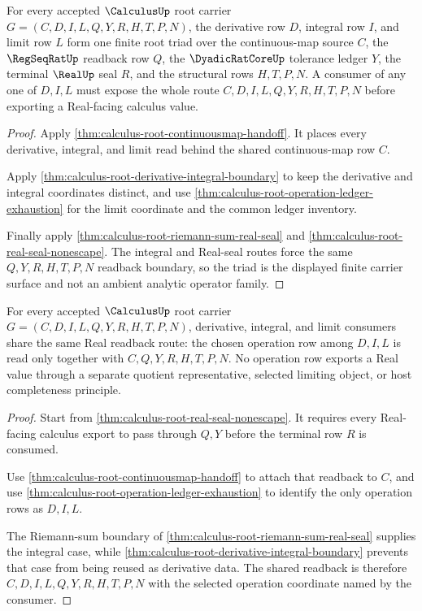 \begin{theorem}
\label{thm:calculus-root-limit-derivative-integral-triad}
For every accepted $\CalculusUp$ root carrier $G=(C,D,I,L,Q,Y,R,H,T,P,N)$, the derivative row $D$, integral row $I$, and limit row $L$ form one finite root triad over the continuous-map source $C$, the $\RegSeqRatUp$ readback row $Q$, the $\DyadicRatCoreUp$ tolerance ledger $Y$, the terminal $\RealUp$ seal $R$, and the structural rows $H,T,P,N$. A consumer of any one of $D,I,L$ must expose the whole route $C,D,I,L,Q,Y,R,H,T,P,N$ before exporting a Real-facing calculus value.
\end{theorem}
\begin{proof}
Apply \autoref{thm:calculus-root-continuousmap-handoff}. It places every derivative, integral, and limit read behind the shared continuous-map row $C$.

Apply \autoref{thm:calculus-root-derivative-integral-boundary} to keep the derivative and integral coordinates distinct, and use \autoref{thm:calculus-root-operation-ledger-exhaustion} for the limit coordinate and the common ledger inventory.

Finally apply \autoref{thm:calculus-root-riemann-sum-real-seal} and \autoref{thm:calculus-root-real-seal-nonescape}. The integral and Real-seal routes force the same $Q,Y,R,H,T,P,N$ readback boundary, so the triad is the displayed finite carrier surface and not an ambient analytic operator family.
\end{proof}

\begin{theorem}
\label{thm:calculus-root-common-real-readback}
For every accepted $\CalculusUp$ root carrier $G=(C,D,I,L,Q,Y,R,H,T,P,N)$, derivative, integral, and limit consumers share the same Real readback route: the chosen operation row among $D,I,L$ is read only together with $C,Q,Y,R,H,T,P,N$. No operation row exports a Real value through a separate quotient representative, selected limiting object, or host completeness principle.
\end{theorem}
\begin{proof}
Start from \autoref{thm:calculus-root-real-seal-nonescape}. It requires every Real-facing calculus export to pass through $Q,Y$ before the terminal row $R$ is consumed.

Use \autoref{thm:calculus-root-continuousmap-handoff} to attach that readback to $C$, and use \autoref{thm:calculus-root-operation-ledger-exhaustion} to identify the only operation rows as $D,I,L$.

The Riemann-sum boundary of \autoref{thm:calculus-root-riemann-sum-real-seal} supplies the integral case, while \autoref{thm:calculus-root-derivative-integral-boundary} prevents that case from being reused as derivative data. The shared readback is therefore $C,D,I,L,Q,Y,R,H,T,P,N$ with the selected operation coordinate named by the consumer.
\end{proof}


